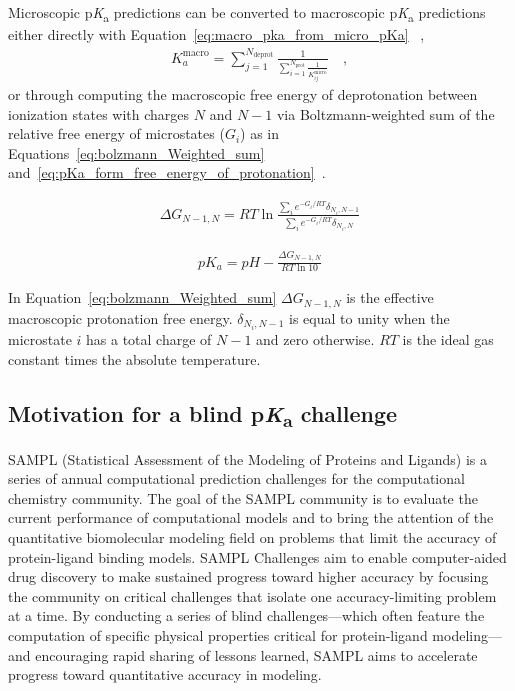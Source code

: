 \documentclass[9pt,lineno,final]{elife}
\newcommand{\pKa}{p\textit{K}\textsubscript{a}}
\begin{document}
Microscopic \pKa{} predictions can be converted to macroscopic \pKa{} predictions either directly with Equation~\ref{eq:macro_pka_from_micro_pKa} ~\citep{Bochevarov:2016:J.Chem.TheoryComput.a},
\begin{align}
 K_a^\text{macro} = \sum_{j=1}^{N_\text{deprot}} \frac{1}{\sum_{i=1}^{N_\text{prot}}\frac{1}{ K_{ij}^\text{micro}}} \quad, \label{eq:macro_pka_from_micro_pKa}
\end{align}
or through computing the macroscopic free energy of deprotonation between ionization states with charges $N$ and $N-1$ via Boltzmann-weighted sum of the relative free energy of microstates ($G_i$) as in Equations~\ref{eq:bolzmann_Weighted_sum} and~\ref{eq:pKa_form_free_energy_of_protonation}~\citep{Selwa:2018:J.Comput.AidedMol.Des.}.

\begin{align}
  \Delta G_{N-1, N} = RT \ln{\frac{\sum_i e^{-G_i/RT} \delta _{N_i, N-1}}{\sum_i e^{-G_i/RT} \delta _{N_i, N}}}
  \label{eq:bolzmann_Weighted_sum}
\end{align}

\begin{align}
  pK_a = pH - \frac{\Delta G_{N-1, N}}{RT \ln{10}}
  \label{eq:pKa_form_free_energy_of_protonation}
\end{align}

In Equation~\ref{eq:bolzmann_Weighted_sum} $\Delta G_{N-1, N}$ is the effective macroscopic protonation free energy.  
$\delta_{N_i, N-1}$ is equal to unity when the microstate $i$ has a total charge of $N-1$ and zero otherwise. 
$RT$ is the ideal gas constant times the absolute temperature.


\subsection{Motivation for a blind \pKa{} challenge}

SAMPL (Statistical Assessment of the Modeling of Proteins and Ligands) is a series of annual computational prediction challenges for the computational chemistry community. 
The goal of the SAMPL community is to evaluate the current performance of computational models and to bring the attention of the quantitative biomolecular modeling field on problems that limit the accuracy of protein-ligand binding models. 
SAMPL Challenges aim to enable computer-aided drug discovery to make sustained progress toward higher accuracy by focusing the community on critical challenges that isolate one accuracy-limiting problem at a time.
By conducting a series of blind challenges---which often feature the computation of specific physical properties critical for protein-ligand modeling---and encouraging rapid sharing of lessons learned, SAMPL aims to accelerate progress toward quantitative accuracy in modeling.
\end{document}
